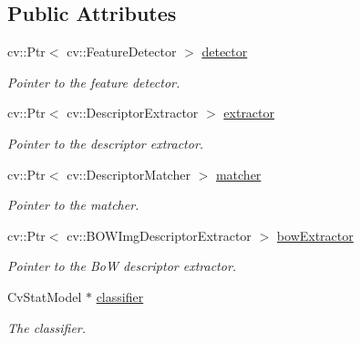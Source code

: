 \subsection*{Public Attributes}
\begin{DoxyCompactItemize}
\item 
\hypertarget{classBOWClassifier_af98420aa410054ef3010f4c098931a41}{
cv::Ptr$<$ cv::FeatureDetector $>$ \hyperlink{classBOWClassifier_af98420aa410054ef3010f4c098931a41}{detector}}
\label{classBOWClassifier_af98420aa410054ef3010f4c098931a41}

\begin{DoxyCompactList}\small\item\em Pointer to the feature detector. \item\end{DoxyCompactList}\item 
\hypertarget{classBOWClassifier_a429b9a83879611a7c3e06eeacec9fb18}{
cv::Ptr$<$ cv::DescriptorExtractor $>$ \hyperlink{classBOWClassifier_a429b9a83879611a7c3e06eeacec9fb18}{extractor}}
\label{classBOWClassifier_a429b9a83879611a7c3e06eeacec9fb18}

\begin{DoxyCompactList}\small\item\em Pointer to the descriptor extractor. \item\end{DoxyCompactList}\item 
\hypertarget{classBOWClassifier_a35057956434d92402d24f2628cfaf35c}{
cv::Ptr$<$ cv::DescriptorMatcher $>$ \hyperlink{classBOWClassifier_a35057956434d92402d24f2628cfaf35c}{matcher}}
\label{classBOWClassifier_a35057956434d92402d24f2628cfaf35c}

\begin{DoxyCompactList}\small\item\em Pointer to the matcher. \item\end{DoxyCompactList}\item 
\hypertarget{classBOWClassifier_a791403fcded48e414d0bc9f1bd8eb5f2}{
cv::Ptr$<$ cv::BOWImgDescriptorExtractor $>$ \hyperlink{classBOWClassifier_a791403fcded48e414d0bc9f1bd8eb5f2}{bowExtractor}}
\label{classBOWClassifier_a791403fcded48e414d0bc9f1bd8eb5f2}

\begin{DoxyCompactList}\small\item\em Pointer to the BoW descriptor extractor. \item\end{DoxyCompactList}\item 
\hypertarget{classBOWClassifier_a6ad705986e924ab6f30dd561e1b991bc}{
CvStatModel $\ast$ \hyperlink{classBOWClassifier_a6ad705986e924ab6f30dd561e1b991bc}{classifier}}
\label{classBOWClassifier_a6ad705986e924ab6f30dd561e1b991bc}

\begin{DoxyCompactList}\small\item\em The classifier. \item\end{DoxyCompactList}\end{DoxyCompactItemize}


